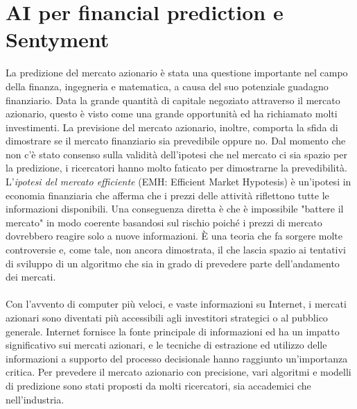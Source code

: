\documentclass[a4paper,12pt]{report}
\begin{document}
\chapter{AI per financial prediction e Sentyment}
\label{cap2}
La predizione del mercato azionario è stata una questione importante nel campo della finanza, ingegneria e matematica, a causa del suo potenziale guadagno finanziario. Data la grande quantità di capitale negoziato attraverso il mercato azionario, questo è visto come una grande opportunità ed ha richiamato molti investimenti. La previsione del mercato azionario, inoltre, comporta la sfida di dimostrare se il mercato finanziario sia prevedibile oppure no. Dal momento che non c'è stato consenso sulla validità dell'ipotesi che nel mercato ci sia spazio per la predizione, i ricercatori hanno molto faticato per dimostrarne la prevedibilità\cite{nn1}. L'\textit{ipotesi del mercato efficiente} (EMH: Efficient Market Hypotesis) è un'ipotesi in economia finanziaria che afferma che i prezzi delle attività riflettono tutte le informazioni disponibili. Una conseguenza diretta è che è impossibile "battere il mercato" in modo coerente basandosi sul rischio poiché i prezzi di mercato dovrebbero reagire solo a nuove informazioni. È una teoria che fa sorgere molte controversie e, come tale, non ancora dimostrata, il che lascia spazio ai tentativi di sviluppo di un algoritmo che sia in grado di prevedere parte dell'andamento dei mercati.\\~\\
Con l'avvento di computer più veloci, e vaste informazioni su Internet, i mercati azionari sono diventati più accessibili agli investitori strategici o al pubblico generale. Internet fornisce la fonte principale di informazioni ed ha un impatto significativo sui mercati azionari, e le tecniche di estrazione ed utilizzo delle informazioni a supporto del processo decisionale hanno raggiunto un'importanza critica. Per prevedere il mercato azionario con precisione, vari algoritmi e modelli di predizione sono stati proposti da molti ricercatori, sia accademici che nell'industria.\\~\\
\end{document}
